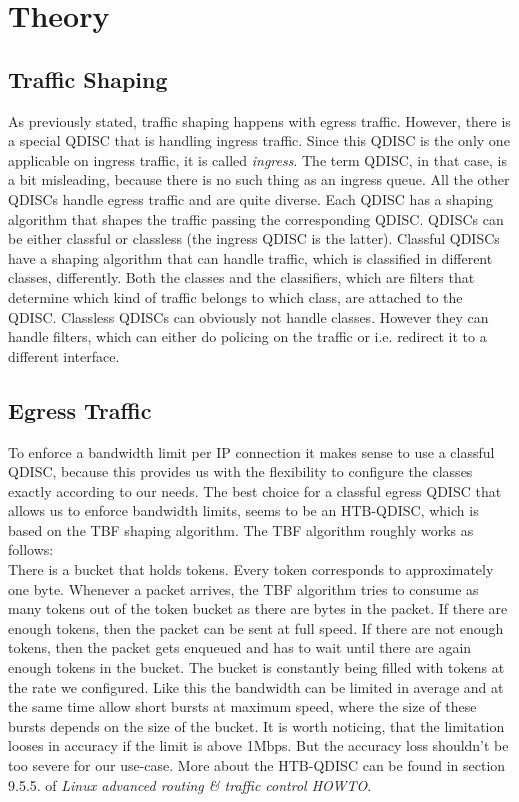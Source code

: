 \section{Theory}
\subsection{Traffic Shaping}\label{Traffic Shaping}
As previously stated, traffic shaping happens with egress traffic. However, there is a special \acs{QDISC} that is handling ingress traffic. Since this \acs{QDISC} is the only one applicable on ingress traffic, it is called \textit{ingress}. The term \acl{QDISC}, in that case, is a bit misleading, because there is no such thing as an ingress queue. All the other \acsp{QDISC} handle egress traffic and are quite diverse. Each \acs{QDISC} has a shaping algorithm that shapes the traffic passing the corresponding \acs{QDISC}. \acsp{QDISC} can be either classful or classless (the ingress \acs{QDISC} is the latter). Classful \acsp{QDISC} have a shaping algorithm that can handle traffic, which is classified in different classes, differently. Both the classes and the classifiers, which are filters that determine which kind of traffic belongs to which class, are attached to the \acs{QDISC}. Classless \acsp{QDISC} can obviously not handle classes. However they can handle filters, which can either do policing on the traffic or i.e. redirect it to a different interface.

\subsection{Egress Traffic}
To enforce a bandwidth limit per \acs{IP} connection it makes sense to use a classful \acs{QDISC}, because this provides us with the flexibility to configure the classes exactly according to our needs. The best choice for a classful egress \acs{QDISC} that allows us to enforce bandwidth limits, seems to be an \ac{HTB}-\acs{QDISC}, which is based on the \ac{TBF} shaping algorithm. The \acs{TBF} algorithm roughly works as follows: 
\\There is a bucket that holds tokens. Every token corresponds to approximately one byte. Whenever a packet arrives, the \acs{TBF} algorithm tries to consume as many tokens out of the token bucket as there are bytes in the packet. If there are enough tokens, then the packet can be sent at full speed. If there are not enough tokens, then the packet gets enqueued and has to wait until there are again enough tokens in the bucket. The bucket is constantly being filled with tokens at the rate we configured. Like this the bandwidth can be limited in average and at the same time allow short bursts at maximum speed, where the size of these bursts depends on the size of the bucket. It is worth noticing, that the limitation looses in accuracy if the limit is above 1Mbps. But the accuracy loss shouldn't be too severe for our use-case.
More about the \acs{HTB}-\acs{QDISC} can be found in section 9.5.5. of \textit{Linux advanced routing \& traffic control HOWTO}\cite{hubert2002linux}.

